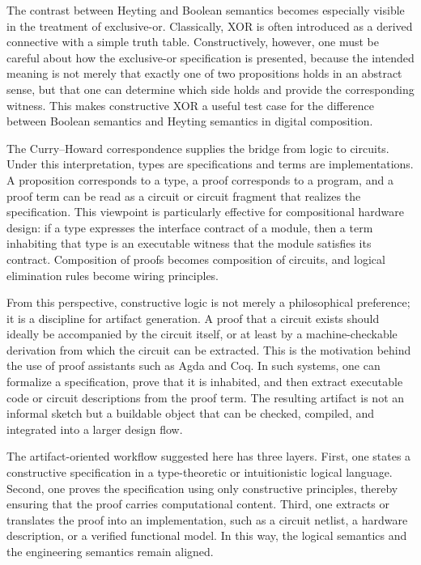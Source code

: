 \documentclass[11pt]{article}
\begin{document}
The contrast between Heyting and Boolean semantics becomes especially visible in the treatment of exclusive-or. Classically, XOR is often introduced as a derived connective with a simple truth table. Constructively, however, one must be careful about how the exclusive-or specification is presented, because the intended meaning is not merely that exactly one of two propositions holds in an abstract sense, but that one can determine which side holds and provide the corresponding witness. This makes constructive XOR a useful test case for the difference between Boolean semantics and Heyting semantics in digital composition.

The Curry--Howard correspondence supplies the bridge from logic to circuits. Under this interpretation, types are specifications and terms are implementations. A proposition corresponds to a type, a proof corresponds to a program, and a proof term can be read as a circuit or circuit fragment that realizes the specification. This viewpoint is particularly effective for compositional hardware design: if a type expresses the interface contract of a module, then a term inhabiting that type is an executable witness that the module satisfies its contract. Composition of proofs becomes composition of circuits, and logical elimination rules become wiring principles.

From this perspective, constructive logic is not merely a philosophical preference; it is a discipline for artifact generation. A proof that a circuit exists should ideally be accompanied by the circuit itself, or at least by a machine-checkable derivation from which the circuit can be extracted. This is the motivation behind the use of proof assistants such as Agda and Coq. In such systems, one can formalize a specification, prove that it is inhabited, and then extract executable code or circuit descriptions from the proof term. The resulting artifact is not an informal sketch but a buildable object that can be checked, compiled, and integrated into a larger design flow.

The artifact-oriented workflow suggested here has three layers. First, one states a constructive specification in a type-theoretic or intuitionistic logical language. Second, one proves the specification using only constructive principles, thereby ensuring that the proof carries computational content. Third, one extracts or translates the proof into an implementation, such as a circuit netlist, a hardware description, or a verified functional model. In this way, the logical semantics and the engineering semantics remain aligned.
\end{document}
